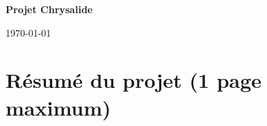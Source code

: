 \documentclass[10pt, a4paper, french]{article}
\newcommand\Information{Someone}                        %
\begin{document}
\begin{titlepage}
    \begin{center}
        \vspace*{3cm}
            
        \Huge
        \textbf{Projet Chrysalide}
            
        \vspace{1cm}
        \huge
            
        \vspace{1.5cm}
        \Large
            
        
            
        \vfill
                \vspace{1cm}
            
        
        \Large
        
        \today
            
    \end{center}
\end{titlepage}

\newpage

\section{Résumé du projet (1 page maximum)}




\end{document}
